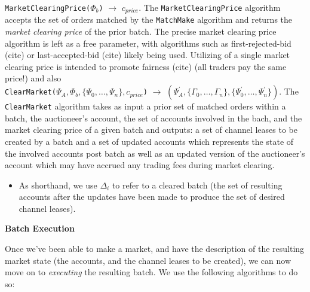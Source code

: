 \documentclass[12pt,a4paper]{article}
\theoremstyle{definition}
\begin{document}


\texttt{MarketClearingPrice($\Phi_b$)} $\rightarrow$ $c_{price}$. The
\texttt{MarketClearingPrice} algorithm accepts the set of orders matched by the
\texttt{MatchMake} algorithm and returns the \emph{market clearing price} of
the prior batch. The precise market clearing price algorithm is left as a free
parameter, with algorithms such as first-rejected-bid (cite) or
last-accepted-bid (cite) likely being used. Utilizing of a single market
clearing price is intended to promote fairness (cite) (all traders pay the same
price!) and also  \\



\texttt{ClearMarket($\Psi_{A}, \Phi_b, \{\Psi_0, \dots, \Psi_n\}, c_{price}$)}
$\rightarrow$ $(\Psi_{A}^\prime, \{\Gamma_0, \dots, \Gamma_n\},
\{\Psi_{0}^\prime, \dots, \Psi_{n}^\prime\})$. The \texttt{ClearMarket}
algorithm takes as input a prior set of matched orders within a batch, the
auctioneer's account, the set of accounts involved in the bach, and the market
clearing price of a given batch and outputs: a set of channel leases to be
created by a batch and a set of updated accounts which represents the state of
the involved accounts post batch as well as an updated version of the
auctioneer's account which may have accrued any trading fees during market
clearing.


\begin{itemize}
    \item As shorthand, we use $\Delta_i$ to refer to a cleared batch (the set of
            resulting accounts after the updates have been made to produce the
            set of desired channel leases).
\end{itemize}


\begin{center}
    \textbf{Batch Execution}
\end{center}

Once we've been able to make a market, and have the description of the
resulting market state (the accounts, and the channel leases to be created), we
can now move on to \emph{executing} the resulting batch. We use the following
algorithms to do so:  \\
\end{document}
